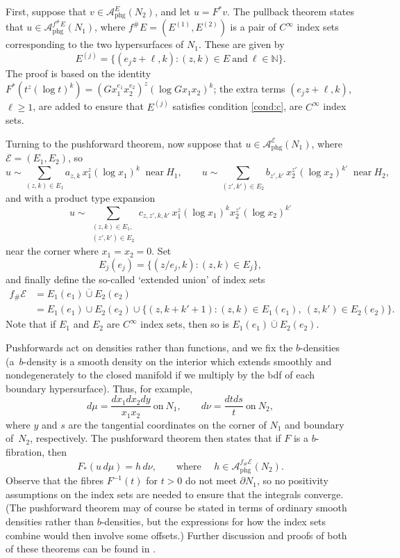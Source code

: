 \documentclass[JEP,XML,SOM,Unicode,NoFloatCountersInSection, NoEqCountersInSection,published]{cedram}
\theoremstyle{plain}
\theoremstyle{definition}
\theoremstyle{remark}
\def\A{\mathcal{A}}
\newcommand{\calE}{\mathcal E}
\begin{document}
First, suppose that $v \in \A_{\mathrm{phg}}^E(N_2)$, and let $u = F^* v$. The pullback theorem states that $u \in \A_{\mathrm{phg}}^{f^{\#}E}(N_1)$, where $f^{\#}E = (E^{(1)}, E^{(2)})$ is a pair of $C^\infty$ index sets corresponding to the two hypersurfaces of $N_1$. These are given by
\[
E^{(j)} = \{ (e_j z + \ell, k): (z,k) \in E\ \mbox{and}\ \ell \in \mathbb N \}.
\]
The proof is based on the identity $F^* (t^z (\log t)^k) = (G x_1^{e_1} x_2^{e_2})^z (\log G x_1 x_2)^k$; the extra terms $(e_j z + \ell, k)$, $\ell \geq 1$, are added to ensure that $E^{(j)}$ satisfies condition \eqref{cond:c}, \ie are $C^\infty$ index sets.

Turning to the pushforward theorem, now suppose that $u \in \A_{\mathrm{phg}}^\calE(N_1)$, where $\calE = (E_1, E_2)$, so
\[
u \sim \sum_{(z,k) \in E_1} a_{z,k} \, x_1^z (\log x_1)^k\;\; \mbox{near}\ H_1, \qquad
u \sim \sum_{(z',k') \in E_2} b_{z',k'} \, x_2^{z'} (\log x_2)^{k'}\;\; \mbox{near}\ H_2,
\]
and with a product type expansion
\begin{equation}
u \sim \sum_{\substack{(z,k) \in E_1,\\ (z', k') \in E_2}} c_{z,z', k, k'}\, x_1^z (\log x_1)^k x_2^{z'} (\log x_2)^{k'}
\label{prodexp}
\end{equation}
near the corner where $x_1 = x_2 = 0$. Set
\[
E_j(e_j) = \{(z/e_j, k): (z,k) \in E_j\},
\]
and finally define the so-called `extended union' of index sets
\begin{align*}
f_{\#} \calE &= E_1(e_1) \overline{\cup} E_2(e_2) \\
&= E_1(e_1) \cup E_2(e_2) \cup \{ (z,k+k'+1): (z,k) \in E_1(e_1),\ (z, k') \in E_2(e_2) \}.
\end{align*}
Note that if $E_1$ and $E_2$ are $C^\infty$ index sets, then so is
$E_1(e_1) \overline{\cup} E_2(e_2)$.

Pushforwards act on densities rather than functions, and we fix the $b$-densities (a~$b$\nobreakdash-density is a smooth density on the interior which extends smoothly
and nondegenerately to the closed manifold if we multiply by the bdf of each boundary hypersurface). Thus, for example,
\[
d\mu = \frac{dx_1 dx_2 dy}{x_1 x_2}\ \mbox{on}\ N_1, \qquad d\nu = \frac{dt ds}{t}\ \mbox{on}\ N_2,
\]
where $y$ and $s$ are the tangential coordinates on the corner of $N_1$ and boundary of~$N_2$, respectively.
The pushforward theorem then states that if $F$ is a $b$-fibration, then
\[
F_*(u\, d\mu) = h \, d\nu, \qquad \text{where }\quad h \in \A^{f_{\#}\calE}_{\mathrm{phg}}(N_2).
\]
Observe that the fibres $F^{-1}(t)$ for $t > 0$ do not meet $\partial N_1$, so no positivity assumptions on the index sets are needed to ensure
that the integrals converge.
(The pushforward theorem may of course be stated in terms of ordinary smooth densities rather than $b$-densities, but the expressions for how
the index sets combine would then involve some offsets.) Further discussion and proofs of both of these theorems can be found in \cite{Melrose1992}.
\end{document}
